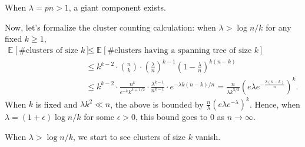 \begin{prev}
	When \(\lambda = pn > 1\), a giant component exists.
\end{prev}

Now, let's formalize the cluster counting calculation: when \(\lambda > \log n / k\) for any fixed \(k \geq 1\),
\begin{equation}\label{eq:Erdős-Rényi-cluster-size}
	\begin{split}
		\mathbb{E}_{}[\text{\#clusters of size \(k\)}]
		 & \leq \mathbb{E}_{}[\text{\#clusters having a spanning tree of size \(k\)} ]                                                   \\
		 & \leq k^{k-2} \cdot \binom{n}{k} \cdot \left( \frac{\lambda }{n} \right) ^{k-1} \left( 1 - \frac{\lambda}{n} \right) ^{k(n-k)} \\
		 & \leq k^{k-2} \cdot \frac{n^k}{e^{-k} k^{k + 1 / 2}} \cdot \frac{\lambda ^{k-1}}{n^{k-1}} \cdot e^{- \lambda k(n-k) / n}
		= \frac{n}{\lambda k^{5 / 2}} \left( e \lambda e^{- \frac{\lambda (n-k)}{n}} \right) ^k.
	\end{split}
\end{equation}
When \(k\) is fixed and \(\lambda k^2 \ll n\), the above is bounded by \(\frac{n}{\lambda } (e \lambda e^{-\lambda })^k\). Hence, when \(\lambda = (1 + \epsilon ) \log n / k\) for some \(\epsilon > 0\), this bound goes to \(0\) as \(n \to \infty \).

\begin{remark}
	When \(\lambda > \log n / k\), we start to see clusters of size \(k\) vanish.
\end{remark}

